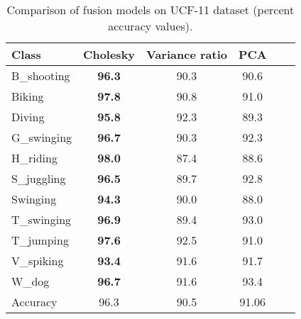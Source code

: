 \begin{table}[]
\centering
\caption{Comparison of fusion models on UCF-11 dataset (percent accuracy values).}\label{tbl:per-action fusionucf}
\begin{tabular}{@{} l c c c c r @{} }
\toprule
Class            & Cholesky & Variance ratio & PCA   \\ \midrule  \midrule
B\_shooting       & \textbf{96.3}    &  90.3   &  90.6  \\
Biking           & \textbf{97.8}    &  90.8   &  91.0    \\
Diving           & \textbf{95.8}    &  92.3   &  89.3   \\
G\_swinging       & \textbf{96.7}    &  90.3   &  92.3   \\
H\_riding         & \textbf{98.0}    &  87.4   &  88.6    \\
S\_juggling       & \textbf{96.5}    &  89.7   &  92.8   \\
Swinging         & \textbf{94.3}    &  90.0   &  88.0    \\
T\_swinging       & \textbf{96.9}    &  89.4   &  93.0   \\
T\_jumping        & \textbf{97.6}    &  92.5   &  91.0    \\
V\_spiking        &\textbf{93.4}    &  91.6   &  91.7   \\
W\_dog            & \textbf{96.7}    &  91.6   &  93.4   \\ \midrule
Accuracy &  96.3   &  90.5   &   91.06   \\ \bottomrule
\end{tabular}
\end{table}

